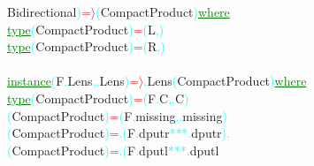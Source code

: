 {\rm{}Bidirectional}\textcolor{cyan}{)}\hsspace \textcolor{red}{=\ensuremath{\rangle}}\hsspace \textcolor{cyan}{(}{\rm{}CompactProduct}\textcolor{cyan}{)}\hsspace \textcolor{green}{\underline{where}}\\\hstab \textcolor{green}{\underline{type}}\hsspace \textcolor{cyan}{(}{\rm{}CompactProduct}\textcolor{cyan}{)}\hsspace \textcolor{red}{=}\hsspace \textcolor{cyan}{(}{\rm{}L}\textcolor{cyan}{,}\textcolor{cyan}{)}\\\hstab \textcolor{green}{\underline{type}}\hsspace \textcolor{cyan}{(}{\rm{}CompactProduct}\textcolor{cyan}{)}\hsspace \textcolor{red}{=}\hsspace \textcolor{cyan}{(}{\rm{}R}\textcolor{cyan}{,}\textcolor{cyan}{)}\\\\\textcolor{green}{\underline{instance}}\hsspace \textcolor{cyan}{(}{\rm{}F}\textcolor{cyan}{.}{\rm{}Lens}\textcolor{cyan}{,}\textcolor{cyan}{.}{\rm{}Lens}\textcolor{cyan}{)}\hsspace \textcolor{red}{=\ensuremath{\rangle}}\textcolor{cyan}{.}{\rm{}Lens}\hsspace \textcolor{cyan}{(}{\rm{}CompactProduct}\textcolor{cyan}{)}\hsspace \textcolor{green}{\underline{where}}\\\hstab \textcolor{green}{\underline{type}}\hsspace \hsspace \textcolor{cyan}{(}{\rm{}CompactProduct}\textcolor{cyan}{)}\hsspace \textcolor{red}{=}\hsspace \textcolor{cyan}{(}{\rm{}F}\textcolor{cyan}{.}{\rm{}C}\textcolor{cyan}{,}\textcolor{cyan}{.}{\rm{}C}\textcolor{cyan}{)}\\\hsspace \textcolor{cyan}{(}{\rm{}CompactProduct}\textcolor{cyan}{)}\hsspace \textcolor{red}{=}\hsspace \textcolor{cyan}{(}{\rm{}F}\textcolor{cyan}{.}{\rm{}missing}\textcolor{cyan}{,}\textcolor{cyan}{.}{\rm{}missing}\textcolor{cyan}{)}\\\hsspace \hsspace \hsspace \textcolor{cyan}{(}{\rm{}CompactProduct}\textcolor{cyan}{)}\hsspace \textcolor{red}{=}\hsspace \textcolor{cyan}{.}\hsspace \textcolor{cyan}{(}{\rm{}F}\textcolor{cyan}{.}{\rm{}dputr}\hsspace \textcolor{cyan}{***}\textcolor{cyan}{.}{\rm{}dputr}\textcolor{cyan}{)}\hsspace \textcolor{cyan}{.}\\\hsspace \hsspace \hsspace \textcolor{cyan}{(}{\rm{}CompactProduct}\textcolor{cyan}{)}\hsspace \textcolor{red}{=}\hsspace \textcolor{cyan}{.}\hsspace \textcolor{cyan}{(}{\rm{}F}\textcolor{cyan}{.}{\rm{}dputl}\hsspace \textcolor{cyan}{***}\textcolor{cyan}{.}{\rm{}dputl}\hsspace 